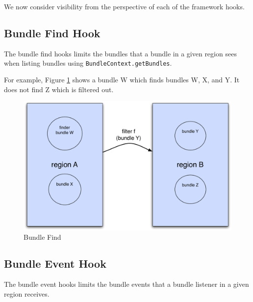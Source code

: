 \documentclass[a4paper,9pt]{article}
\begin{document}
We now consider visibility from the perspective of each of the framework hooks.

\subsection{Bundle Find Hook}

The bundle find hooks limits the bundles that a bundle in a given region sees when listing bundles using
\texttt{BundleContext.getBundles}.

For example, Figure \ref{fig:bfind} shows a bundle W which finds bundles W, X, and Y.
It does not find Z which is filtered out. 
\begin{figure}[h!]
\begin{center}
\includegraphics*[scale=0.4]{bundle-find.pdf}
\caption{Bundle Find \label{fig:bfind}}
\end{center}
\end{figure}

\subsection{Bundle Event Hook}

The bundle event hooks limits the bundle events that a bundle listener in a given region receives.
\end{document}
